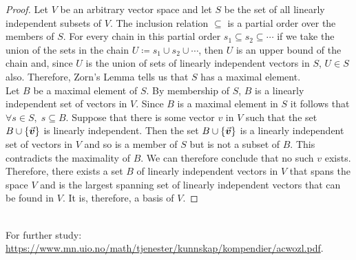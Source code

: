 \documentclass[../MathsNotesBase.tex]{subfiles}
\begin{document}
{	
		\bigskip
		\begin{proof}
			Let $V$ be an arbitrary vector space and let $S$ be the set of all linearly independent subsets of $V$. The inclusion relation $\subseteq$ is a partial order over the members of $S$. For every chain in this partial order ${ s_1 \subseteq s_2 \subseteq \cdots }$ if we take the union of the sets in the chain ${ U \coloneqq s_1 \cup s_2 \cup \cdots }$, then $U$ is an upper bound of the chain and, since $U$ is the union of sets of linearly independent vectors in $S$, ${ U \in S }$ also. Therefore, Zorn's Lemma tells us that $S$ has a maximal element.\\
			Let $B$ be a maximal element of $S$. By membership of $S$, $B$ is a linearly independent set of vectors in $V$. Since $B$ is a maximal element in $S$ it follows that ${ \forall s \in S, \; s \subseteq B }$. Suppose that there is some vector $v$ in $V$ such that the set ${ B \cup \{\vec{\bm{v}}\} }$ is linearly independent. Then the set ${ B \cup \{\vec{\bm{v}}\} }$ is a linearly independent set of vectors in $V$ and so is a member of $S$ but is not a subset of $B$. This contradicts the maximality of $B$. We can therefore conclude that no such $v$ exists.\\
			Therefore, there exists a set $B$ of linearly independent vectors in $V$ that spans the space $V$ and is the largest spanning set of linearly independent vectors that can be found in $V$. It is, therefore, a basis of $V$.
		\end{proof}
		
		
		\bigskip
		\\
		
		For further study: \url{https://www.mn.uio.no/math/tjenester/kunnskap/kompendier/acwozl.pdf}.
	}
	
\end{document}
